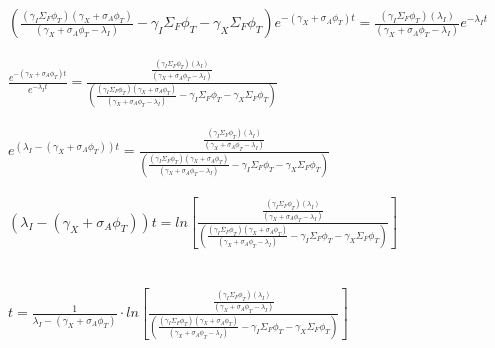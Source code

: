 \documentclass[11pt,a4paper]{article}
\begin{document}
\noindent $(\frac{(\gamma_I\Sigma_F\phi_T)(\gamma_X+\sigma_A\phi_T)}{(\gamma_X+\sigma_A\phi_T-\lambda_I)}-\gamma_I\Sigma_F\phi_T-\gamma_X\Sigma_F\phi_T)e^{-(\gamma_X+\sigma_A\phi_T)t}=\frac{(\gamma_I\Sigma_F\phi_T)(\lambda_I)}{(\gamma_X+\sigma_A\phi_T-\lambda_I)}e^{-\lambda_I t}$ \\ \\

\noindent $\frac{e^{-(\gamma_X+\sigma_A\phi_T)t}}{e^{-\lambda_I t}}=\frac{\frac{(\gamma_I\Sigma_F\phi_T)(\lambda_I)}{(\gamma_X+\sigma_A\phi_T-\lambda_I)}}{(\frac{(\gamma_I\Sigma_F\phi_T)(\gamma_X+\sigma_A\phi_T)}{(\gamma_X+\sigma_A\phi_T-\lambda_I)}-\gamma_I\Sigma_F\phi_T-\gamma_X\Sigma_F\phi_T)}$ \\ \\

\noindent $e^{(\lambda_I-(\gamma_X+\sigma_A\phi_T))t}=\frac{\frac{(\gamma_I\Sigma_F\phi_T)(\lambda_I)}{(\gamma_X+\sigma_A\phi_T-\lambda_I)}}{(\frac{(\gamma_I\Sigma_F\phi_T)(\gamma_X+\sigma_A\phi_T)}{(\gamma_X+\sigma_A\phi_T-\lambda_I)}-\gamma_I\Sigma_F\phi_T-\gamma_X\Sigma_F\phi_T)}$ \\ \\

\noindent $(\lambda_I-(\gamma_X+\sigma_A\phi_T))t=ln[\frac{\frac{(\gamma_I\Sigma_F\phi_T)(\lambda_I)}{(\gamma_X+\sigma_A\phi_T-\lambda_I)}}{(\frac{(\gamma_I\Sigma_F\phi_T)(\gamma_X+\sigma_A\phi_T)}{(\gamma_X+\sigma_A\phi_T-\lambda_I)}-\gamma_I\Sigma_F\phi_T-\gamma_X\Sigma_F\phi_T)}]$ \\ \\ \\

\noindent $t=\frac{1}{\lambda_I-(\gamma_X+\sigma_A\phi_T)}\cdot  ln[\frac{\frac{(\gamma_I\Sigma_F\phi_T)(\lambda_I)}{(\gamma_X+\sigma_A\phi_T-\lambda_I)}}{(\frac{(\gamma_I\Sigma_F\phi_T)(\gamma_X+\sigma_A\phi_T)}{(\gamma_X+\sigma_A\phi_T-\lambda_I)}-\gamma_I\Sigma_F\phi_T-\gamma_X\Sigma_F\phi_T)}]$
\end{document}
